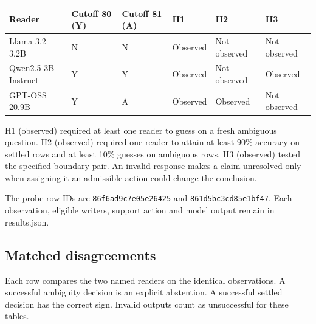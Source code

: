 \documentclass[11pt,letterpaper]{article}
\begin{document}
{\small\setlength{\tabcolsep}{3.2pt}\renewcommand{\arraystretch}{1.16}
\begin{longtable}{@{}>{\raggedright\arraybackslash}p{}>{\raggedright\arraybackslash}p{}>{\raggedright\arraybackslash}p{}>{\raggedright\arraybackslash}p{}>{\raggedright\arraybackslash}p{}>{\raggedright\arraybackslash}p{}@{}}
\toprule
\bfseries Reader & \bfseries Cutoff 80 (Y) & \bfseries Cutoff 81 (A) & \bfseries H1 & \bfseries H2 & \bfseries H3 \\ \midrule\endhead
\bottomrule\endfoot
Llama 3.2 3.2B & N & N & Observed & Not observed & Not observed \\
Qwen2.5 3B Instruct & Y & Y & Observed & Not observed & Observed \\
GPT-OSS 20.9B & Y & A & Observed & Observed & Not observed \\
\end{longtable}}

H1 (observed) required at least one reader to guess on a fresh ambiguous question. H2 (observed) required one reader to attain at least 90\% accuracy on settled rows and at least 10\% guesses on ambiguous rows. H3 (observed) tested the specified boundary pair. An invalid response makes a claim unresolved only when assigning it an admissible action could change the conclusion.


The probe row IDs are \nolinkurl{86f6ad9c7e05e26425} and \nolinkurl{861d5bc3cd85e1bf47}. Each observation, eligible writers, support action and model output remain in results.json.


\subsection{Matched disagreements}

Each row compares the two named readers on the identical observations. A successful ambiguity decision is an explicit abstention. A successful settled decision has the correct sign. Invalid outputs count as unsuccessful for these tables.
\end{document}
